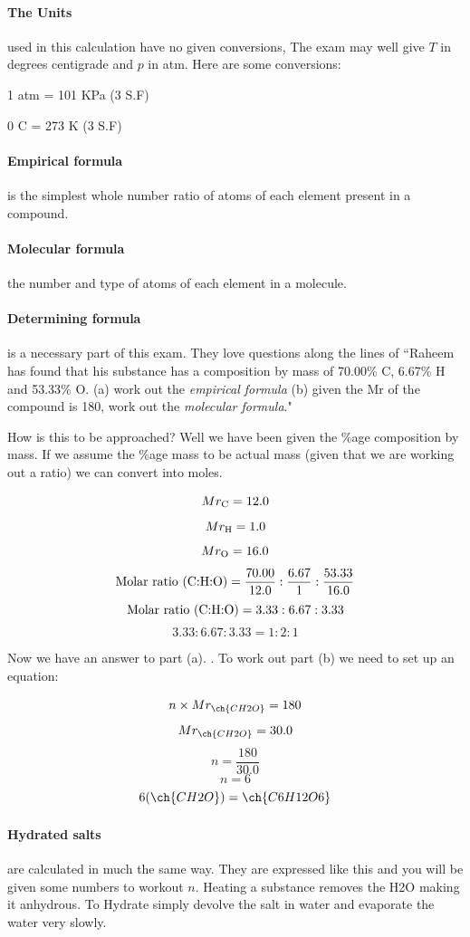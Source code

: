 	\paragraph{The Units} used in this calculation have no given conversions, The exam may well give $T$ in degrees centigrade and $p$ in atm. Here are some conversions:
    
	1 atm = 101 KPa (3 S.F)
	
	0  C = 273 K (3 S.F)
	
	\paragraph{Empirical formula} is the simplest whole number ratio of atoms of each element present in a compound.
	
	\paragraph{Molecular formula} the number and type of atoms of each element in a molecule.
    
    \paragraph{Determining formula} is a necessary part of this exam. They love questions along the lines of ``Raheem has found that his substance has a composition by mass of 70.00\% C, 6.67\% H and 53.33\% O. (a) work out the \textit{empirical formula} (b) given the Mr of the compound is 180, work out the \textit{molecular formula}."
    
    How is this to be approached? Well we have been given the \%age composition by mass. If we assume the \%age mass to be actual mass (given that we are working out a ratio) we can convert into moles.
    
    \[Mr_\textnormal{C} = 12.0\]
    \[Mr_\textnormal{H} = 1.0\]
    \[Mr_\textnormal{O} = 16.0\]
    \[\textnormal{Molar ratio (C:H:O)} = \frac{70.00}{12.0} : \frac{6.67}{1} : \frac{53.33}{16.0}\]
    \[\textnormal{Molar ratio (C:H:O)} = 3.33 : 6.67 : 3.33\]
    \[3.33 : 6.67 : 3.33 = 1 : 2 : 1\]
    
    Now we have an answer to part (a). . To work out part (b) we need to set up an equation:
    
    \[n \times Mr_{\ch{CH2O}} = 180\]
    \[Mr_{\ch{CH2O}} = 30.0\]
    \[n = \frac{180}{30.0}\]
    \[n = 6\]
    \[6(\ch{CH2O}) = \ch{C6H12O6}\]
    
    \paragraph{Hydrated salts} are calculated in much the same way. They are expressed like this  and you will be given some numbers to workout $n$. Heating a substance removes the H2O making it anhydrous. To Hydrate simply devolve the salt in water and evaporate the water very slowly.
    
